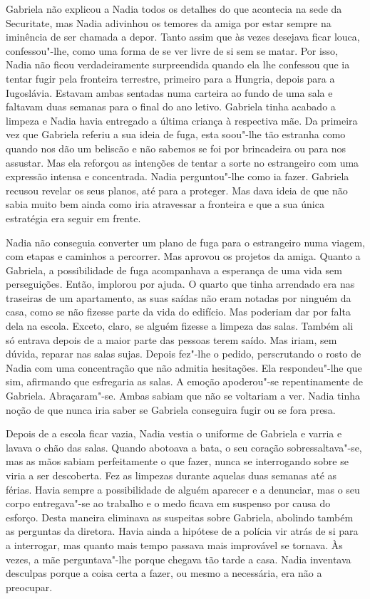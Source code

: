 Gabriela não explicou a Nadia todos os detalhes do que
acontecia na sede da Securitate, mas Nadia adivinhou os temores da amiga
por estar sempre na iminência de ser chamada a depor. Tanto assim que às
vezes desejava ficar louca, confessou"-lhe, como uma forma de se ver
livre de si sem se matar. Por isso, Nadia não ficou verdadeiramente
surpreendida quando ela lhe confessou que ia tentar fugir pela fronteira
terrestre, primeiro para a Hungria, depois para a Iugoslávia. Estavam
ambas sentadas numa carteira ao fundo de uma sala e faltavam duas
semanas para o final do ano letivo. Gabriela tinha acabado a limpeza e
Nadia havia entregado a última criança à respectiva mãe. Da
primeira vez que Gabriela referiu a sua ideia de fuga, esta soou"-lhe tão
estranha como quando nos dão um beliscão e não sabemos se foi por
brincadeira ou para nos assustar. Mas ela reforçou as intenções de
tentar a sorte no estrangeiro com uma expressão intensa e concentrada.
Nadia perguntou"-lhe como ia fazer. Gabriela recusou revelar os seus
planos, até para a proteger. Mas dava ideia de que não sabia muito bem
ainda como iria atravessar a fronteira e que a sua única estratégia era
seguir em frente.

Nadia não conseguia converter um plano de fuga para o estrangeiro numa
viagem, com etapas e caminhos a percorrer. Mas aprovou os projetos da
amiga. Quanto a Gabriela, a possibilidade de fuga acompanhava a esperança de uma vida sem perseguições. Então, implorou por ajuda. O quarto
que tinha arrendado era nas traseiras de um apartamento, as suas saídas
não eram notadas por ninguém da casa, como se não fizesse parte da vida
do edifício. Mas poderiam dar por falta dela na escola. Exceto, claro,
se alguém fizesse a limpeza das salas. Também ali só entrava depois de
a maior parte das pessoas terem saído. Mas iriam, sem dúvida, reparar
nas salas sujas. Depois fez"-lhe o pedido, perscrutando o rosto de Nadia
com uma concentração que não admitia hesitações. Ela respondeu"-lhe que
sim, afirmando que esfregaria as salas. A emoção apoderou"-se
repentinamente de Gabriela. Abraçaram"-se. Ambas sabiam que não se
voltariam a ver. Nadia tinha noção de que nunca iria saber se Gabriela
conseguira fugir ou se fora presa.

Depois de a escola ficar vazia, Nadia vestia o uniforme
de Gabriela e varria e lavava o chão das salas. Quando
abotoava a bata, o seu coração sobressaltava"-se, mas as mãos sabiam
perfeitamente o que fazer, nunca se interrogando sobre se viria a ser
descoberta. Fez as limpezas durante aquelas duas semanas até as férias.
Havia sempre a possibilidade de alguém aparecer e a denunciar, mas o seu
corpo entregava"-se ao trabalho e o medo ficava em suspenso por causa do
esforço. Desta maneira eliminava as suspeitas sobre Gabriela, abolindo
também as perguntas da diretora. Havia ainda a hipótese de a polícia
vir atrás de si para a interrogar, mas quanto mais tempo passava mais
improvável se tornava. Às vezes, a mãe perguntava"-lhe porque chegava tão tarde a casa. Nadia inventava desculpas porque a
coisa certa a fazer, ou mesmo a necessária, era não a preocupar.

